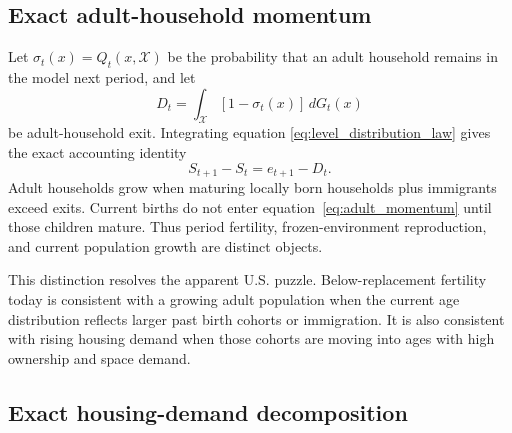 \documentclass[11pt]{article}
\theoremstyle{definition}
\newcommand{\1}{\mathbf 1}
\newcommand{\X}{\mathcal X}
\begin{document}
\subsection{Exact adult-household momentum}

Let $\sigma_t(x)=Q_t(x,\X)$ be the probability that an adult household remains
in the model next period, and let
\begin{equation}
 D_t=\int_{\X}[1-\sigma_t(x)]\,dG_t(x)
 \label{eq:adult_exits}
\end{equation}
be adult-household exit. Integrating equation
\eqref{eq:level_distribution_law} gives the exact accounting identity
\begin{equation}
 \boxed{S_{t+1}-S_t=e_{t+1}-D_t.}
 \label{eq:adult_momentum}
\end{equation}
Adult households grow when maturing locally born households plus immigrants
exceed exits. Current births do not enter equation~\eqref{eq:adult_momentum}
until those children mature. Thus period fertility, frozen-environment
reproduction, and current population growth are distinct objects.

This distinction resolves the apparent U.S. puzzle. Below-replacement
fertility today is consistent with a growing adult population when the current
age distribution reflects larger past birth cohorts or immigration. It is also
consistent with rising housing demand when those cohorts are moving into ages
with high ownership and space demand.

\subsection{Exact housing-demand decomposition}
\end{document}
